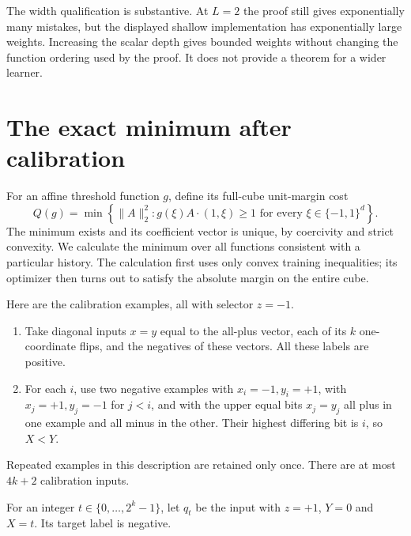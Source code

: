 \documentclass[11pt]{article}
\theoremstyle{remark}\newtheorem{remark}[theorem]{Remark}
\begin{document}
The width qualification is substantive. At $L=2$ the proof still gives
exponentially many mistakes, but the displayed shallow implementation has
exponentially large weights. Increasing the scalar depth gives bounded
weights without changing the function ordering used by the proof. It does
not provide a theorem for a wider learner.

\section{The exact minimum after calibration}

For an affine threshold function $g$, define its full-cube unit-margin cost
\[
 Q(g)=\min\left\{\|A\|_2^2:
       g(\xi) A\mathbin{\cdot}(1,\xi)\ge1
       \text{ for every }\xi\in\{-1,1\}^d\right\}.
\]
The minimum exists and its coefficient vector is unique, by coercivity
and strict convexity. We calculate the minimum over all functions
consistent with a particular history. The calculation first uses only
convex training inequalities; its optimizer then turns out to satisfy the
absolute margin on the entire cube.

Here are the calibration examples, all with selector $z=-1$.
\begin{enumerate}
\item Take diagonal inputs $x=y$ equal to the all-plus vector, each of
its $k$ one-coordinate flips, and the negatives of these vectors.
All these labels are positive.
\item For each $i$, use two negative examples with
$x_i=-1,y_i=+1$, with $x_j=+1,y_j=-1$ for $j<i$, and with the upper equal
bits $x_j=y_j$ all plus in one example and all minus in the other.
Their highest differing bit is $i$, so $X<Y$.
\end{enumerate}
Repeated examples in this description are retained only once. There are
at most $4k+2$ calibration inputs.

For an integer $t\in\{0,\ldots,2^k-1\}$, let $q_t$ be the input with
$z=+1$, $Y=0$ and $X=t$. Its target label is negative.
\end{document}
